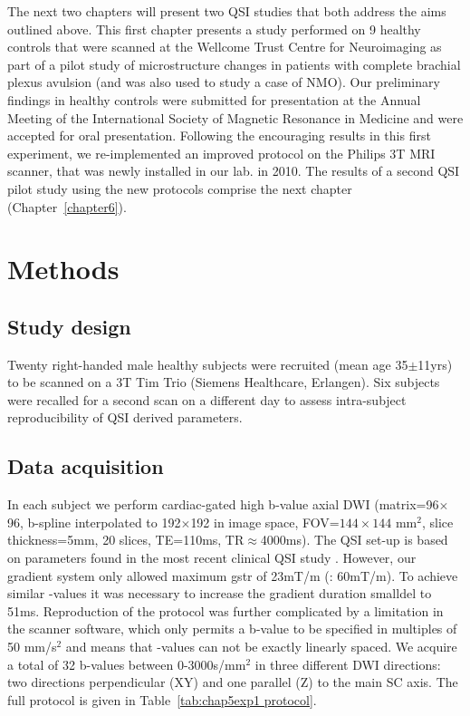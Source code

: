 The next two chapters will present two \gls{QSI} studies that both address the aims outlined above. This first chapter presents a study performed on 9 healthy controls that were scanned at the Wellcome Trust Centre for Neuroimaging as part of a pilot study of microstructure changes in patients with complete brachial plexus avulsion \citep{Kachramanoglou:2012} (and was also used to study a case of \gls{NMO}). Our preliminary findings in healthy controls were submitted for presentation at the Annual Meeting of the International Society of Magnetic Resonance in Medicine and were accepted for oral presentation. Following the encouraging results in this first experiment, we re-implemented an improved protocol on the Philips 3T MRI scanner, that was newly installed in our lab. in 2010. The results of a second \gls{QSI} pilot study using the new protocols comprise the next chapter (Chapter~\ref{chapter6}).

\section{Methods}
\label{sec:chapter 5 exp1 methods}
\subsection{Study design}
Twenty right-handed male healthy subjects were recruited (mean age 35$\pm$11yrs) to be scanned on a 3T Tim Trio (Siemens Healthcare, Erlangen). Six subjects were recalled for a second scan on a different day to assess intra-subject reproducibility of \gls{QSI} derived parameters.

\subsection{Data acquisition}
In each subject we perform cardiac-gated high b-value axial {\gls{DWI}} (matrix=96$\times$96, b-spline interpolated to 192$\times$192 in image space, FOV=$144\times144$ mm$^2$, slice thickness=5mm, 20 slices, TE=110ms, TR$\approx$4000ms). The \gls{QSI} set-up is based on parameters found in the most recent clinical \gls{QSI} study \citep{Farrell:2008}. However, our gradient system only allowed maximum \gls{gstr} of 23mT/m (\citet{Farrell:2008}: 60mT/m). To achieve similar {\q}-values it was necessary to increase the gradient duration \gls{smalldel} to 51ms. Reproduction of the protocol was further complicated by a limitation in the scanner software, which only permits a b-value to be specified in multiples of 50 mm/s$^2$ and means that {\q}-values can not be exactly linearly spaced. We acquire a total of 32 b-values between 0-3000s/mm$^2$ in three different {\gls{DWI}} directions: two directions perpendicular (XY) and one parallel (Z) to the main {\gls{SC}} axis. The full protocol is given in Table~\ref{tab:chap5exp1 protocol}.

